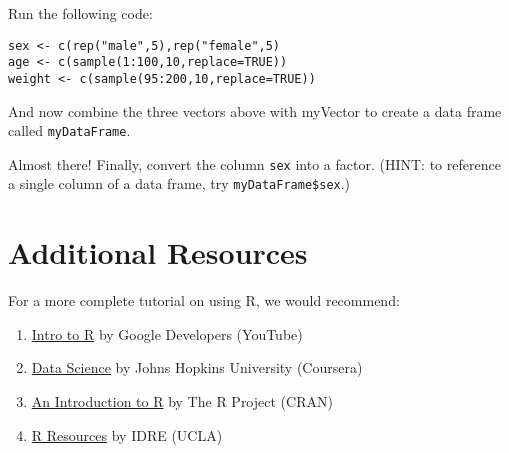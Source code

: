 \prob Run the following code:

\begin{framed}
\begin{Verbatim}[samepage=TRUE]
sex <- c(rep("male",5),rep("female",5)
age <- c(sample(1:100,10,replace=TRUE))
weight <- c(sample(95:200,10,replace=TRUE))
\end{Verbatim}
\end{framed}
And now combine the three vectors above with myVector to create a data frame called \verb|myDataFrame|.

\prob Almost there! Finally, convert the column \verb|sex| into a factor. (HINT: to reference a single column of a data frame, try \verb|myDataFrame$sex|.)

\section{Additional Resources}
For a more complete tutorial on using R, we would recommend:
\begin{enumerate}
	\item \href{https://www.youtube.com/playlist?list=PLOU2XLYxmsIK9qQfztXeybpHvru-TrqAP}{Intro to R} by Google Developers (YouTube)
	\item \href{https://www.coursera.org/specialization/jhudatascience/1/courses}{Data Science} by Johns Hopkins University (Coursera)
	\item \href{http://cran.r-project.org/doc/manuals/R-intro.html}{An Introduction to R} by The R Project (CRAN)
	\item \href{http://statistics.ats.ucla.edu/stat/r/}{R Resources} by IDRE (UCLA)
\end{enumerate}